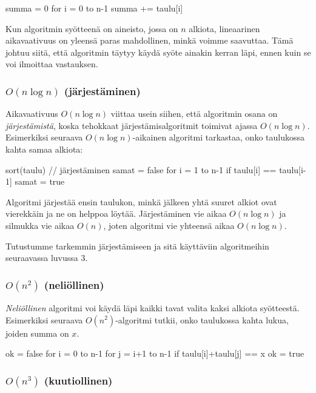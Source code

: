 \begin{code}
summa = 0
for i = 0 to n-1
    summa += taulu[i]
\end{code}

Kun algoritmin syötteenä on aineisto, jossa on $n$ alkiota,
lineaarinen aikavaativuus on yleensä paras mahdollinen,
minkä voimme saavuttaa.
Tämä johtuu siitä, että algoritmin täytyy käydä syöte
ainakin kerran läpi, ennen kuin se voi ilmoittaa vastauksen.

\subsubsection{$O(n \log n)$ (järjestäminen)}

Aikavaativuus $O(n \log n)$ viittaa usein siihen,
että algoritmin osana on \emph{järjes\-tämistä},
koska tehokkaat järjestämisalgoritmit
toimivat ajassa $O(n \log n)$.
Esimerkiksi seuraava $O(n \log n)$-aikainen
algoritmi tarkastaa, onko taulukossa kahta samaa alkiota:

\begin{code}
sort(taulu) // järjestäminen
samat = false
for i = 1 to n-1
    if taulu[i] == taulu[i-1]
        samat = true
\end{code}

Algoritmi järjestää ensin taulukon, minkä jälkeen yhtä
suuret alkiot ovat vierekkäin ja ne on helppoa löytää.
Järjestäminen vie aikaa $O(n \log n)$
ja silmukka vie aikaa $O(n)$, joten algoritmi vie
yhteensä aikaa $O(n \log n)$.

Tutustumme tarkemmin järjestämiseen ja sitä käyttäviin
algoritmeihin seuraavassa luvussa 3.


\subsubsection{$O(n^2)$ (neliöllinen)}

\emph{Neliöllinen} algoritmi voi käydä läpi kaikki tavat valita
kaksi alkiota syöt\-teestä.
Esimerkiksi seuraava $O(n^2)$-algoritmi tutkii, onko taulukossa
kahta lukua, joiden summa on $x$.

\begin{code}
ok = false
for i = 0 to n-1
    for j = i+1 to n-1
        if taulu[i]+taulu[j] == x
            ok = true
\end{code}


\subsubsection{$O(n^3)$ (kuutiollinen)}

